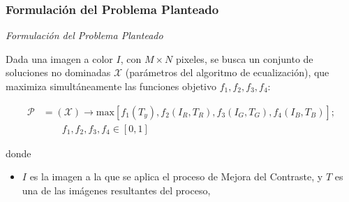 \documentclass[usenames,dvipsnames]{beamer}
\begin{document}
\begin{frame}
\frametitle{Formulación del Problema Planteado} 
\begin{exampleblock}{\textit{Formulación del Problema Planteado}}

Dada una imagen a color $I$, con $M \times N$ pixeles, se busca un conjunto de soluciones no dominadas $\mathscr{X}$ (parámetros del algoritmo de ecualización), que maximiza simultáneamente las funciones objetivo $f_1,f_2,f_3,f_4$:

\begin{equation}
\begin{split}
\mathscr{P} &= (\mathscr{X}) \longrightarrow \text{max}[f_1(T_y),f_2(I_R,T_R),f_3(I_G,T_G),f_4(I_B,T_B)]; \\
            & \qquad f_1,f_2,f_3,f_4 \in [0,1]
\end{split}
\end{equation}

\end{exampleblock}

donde

\begin{itemize}
        \item $I$ es la imagen a la que se aplica el proceso de Mejora del Contraste, y $T$\label{symbol:imejorada} es una de las imágenes resultantes del proceso,
\end{itemize}


\end{frame}
\end{document}
